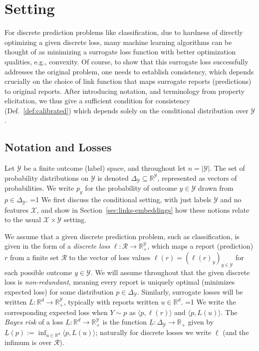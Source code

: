 \documentclass[12pt]{article}
\newcommand{\Comments}{1}
\newcommand{\mytodo}[2]{\ifnum\Comments=1%
  \todo[linecolor=#1!80!black,backgroundcolor=#1,bordercolor=#1!80!black]{#2}\fi}
\newcommand{\raft}[1]{\mytodo{green!20!white}{RF: #1}}
\newcommand{\btw}[1]{\mytodo{gray!20!white}{[BTW: #1]}}%
\newcommand{\reals}{\mathbb{R}}
\newcommand{\simplex}{\Delta_\Y}
\newcommand{\R}{\mathcal{R}}
\newcommand{\X}{\mathcal{X}}
\newcommand{\Y}{\mathcal{Y}}
\newcommand{\risk}[1]{\underline{#1}}
\newcommand{\inprod}[2]{\langle #1, #2 \rangle}%
\begin{document}


\section{Setting}
\label{sec:setting}

For discrete prediction problems like classification, due to hardness of directly optimizing a given discrete loss, many machine learning algorithms can be thought of as minimizing a surrogate loss function with better optimization qualities, e.g., convexity.
Of course, to show that this surrogate loss successfully addresses the original problem, one needs to establish consistency, which depends crucially on the choice of link function that maps surrogate reports (predictions) to original reports.
After introducing notation, and terminology from property elicitation, we thus give a sufficient condition for consistency (Def.~\ref{def:calibrated}) which depends solely on the conditional distribution over $\Y$.

\subsection{Notation and Losses}
\label{sec:notation-losses}

Let $\Y$ be a finite outcome (label) space, and throughout let $n=|\Y|$.
The set of probability distributions on $\Y$ is denoted $\simplex\subseteq\reals^{\Y}$, represented as vectors of probabilities.
We write $p_y$ for the probability of outcome $y \in \Y$ drawn from $p \in \simplex$.
\raft{ADDED}
We first discuss the conditional setting, with just labels $\Y$ and no features $\X$, and show in Section~\ref{sec:links-embeddings} how these notions relate to the usual $\X\times\Y$ setting.

We assume that a given discrete prediction problem, such as classification, is given in the form of a \emph{discrete loss} $\ell:\R\to\reals^\Y_+$, which maps a report (prediction) $r$ from a finite set $\R$ to the vector of loss values $\ell(r) = (\ell(r)_y)_{y\in\Y}$ for each possible outcome $y\in\Y$.
We will assume throughout that the given discrete loss is \emph{non-redundant}, meaning every report is uniquely optimal (minimizes expected loss) for some distribution $p\in\simplex$.
Similarly, surrogate losses will be written $L:\reals^d\to\reals^\Y_+$, typically with reports written $u\in\reals^d$.
\btw{Cut generic loss}%
We write the corresponding expected loss when $Y \sim p$ as $\inprod{p}{\ell(r)}$ and $\inprod{p}{L(u)}$.
The \emph{Bayes risk} of a loss $L:\reals^d\to\reals^\Y_+$ is the function $\risk{L}:\simplex\to\reals_+$ given by $\risk{L}(p) := \inf_{u\in\reals^d} \inprod{p}{L(u)}$; naturally for discrete losses we write $\risk{\ell}$ (and the infimum is over $\R$).
\end{document}
